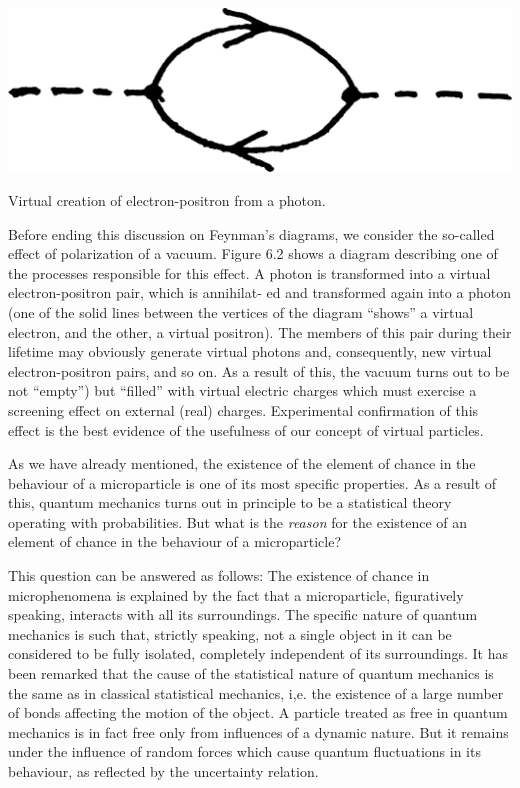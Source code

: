 \documentclass[a4paper,sfsidenotes,colorlinks=true]{tufte-book}
\numberwithin{equation}{section}
\numberwithin{figure}{section}
\begin{document}
\begin{marginfigure}[1cm]%
\centering
\includegraphics[width=0.8\linewidth]{figures/fig-06-02.pdf}
\caption{Virtual creation of electron-positron from a photon.}
\label{fig-6.2}
\end{marginfigure}


Before ending this discussion on Feynman's diagrams, we consider the
so-called effect of polarization of a vacuum. Figure 6.2 shows a
diagram describing one of the processes responsible for this effect. A
photon is transformed into a virtual electron-positron pair, which is
annihilat- ed and transformed again into a photon (one of the solid
lines between the vertices of the diagram ``shows'' a virtual
electron, and the other, a virtual positron). The members of this pair
during their lifetime may obviously generate virtual photons and,
consequently, new virtual electron-positron pairs, and so on. As a
result of this, the vacuum turns out to be not ``empty'') but
``filled'' with virtual electric charges which must exercise a
screening effect on external (real) charges. Experimental confirmation
of this effect is the best evidence of the usefulness of our concept
of virtual particles.

As  we have already
mentioned, the existence of the element of chance in the behaviour of
a microparticle is one of its most specific properties. As a result of
this, quantum mechanics turns out in principle to be a statistical
theory operating with probabilities. But what is the \emph{reason} for
the existence of an element of chance in the behaviour of a
microparticle?

This question can be answered as follows: The existence of chance in
microphenomena is explained by the fact that a microparticle,
figuratively speaking, interacts with all its surroundings. The
specific nature of quantum mechanics is such that, strictly speaking,
not a single object in it can be considered to be fully isolated,
completely independent of its surroundings. It has been
remarked\cite{myakishev-1973} that the cause of the statistical nature
of quantum mechanics is the same as in classical statistical
mechanics, i,e. the existence of a large number of bonds affecting the
motion of the object. A particle treated as free in quantum mechanics
is in fact free only from influences of a dynamic nature. But it
remains under the influence of random forces which cause quantum
fluctuations in its behaviour, as reflected by the uncertainty
relation.
\end{document}
